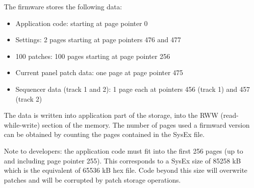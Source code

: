 The firmware stores the following data:
\begin{itemize}
  \item Application code: starting at page pointer 0
  \item Settings: 2 pages starting at page pointers 476 and 477 
  \item 100 patches: 100 pages starting at page pointer 256
  \item Current panel patch data: one page at page pointer 475
  \item Sequencer data (track 1 and 2): 1 page each at pointers 456 (track 1) and 457 (track 2)
\end{itemize}

The data is written into application part of the storage, into the RWW (read-while-write) section of the memory. The number of pages used a firmward version can be obtained by counting the pages contained in the SysEx file.

Note to developers: the application code must fit into the first 256 pages (up to and including page pointer 255). This corresponds to a SysEx size of 85258 kB which is the equivalent of 65536 kB hex file. Code beyond this size will overwrite patches and will be corrupted by patch storage operations.
